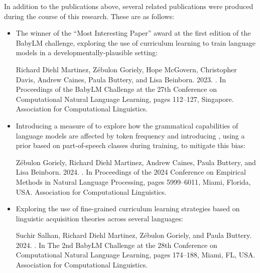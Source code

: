 In addition to the publications above, several related publications were produced during the course of this research. These are as follows:

\begin{itemize}
\item The winner of the \enquote{Most Interesting Paper} award at the first edition of the BabyLM challenge, exploring the use of curriculum learning to train language models in a developmentally-plausible setting:
\begin{mdframed}[linewidth=1pt]
    Richard Diehl Martinez, Z\'ebulon Goriely, Hope McGovern, Christopher Davis, Andrew Caines, Paula Buttery, and Lisa Beinborn. 2023. \href{https://aclanthology.org/2023.conll-babylm.10/}{}. In Proceedings of the BabyLM Challenge at the 27th Conference on Computational Natural Language Learning, pages 112--127, Singapore. Association for Computational Linguistics.
\end{mdframed}

\item Introducing a measure of  to explore how the grammatical capabilities of language models are affected by token frequency and introducing , using a prior based on part-of-speech classes during training, to mitigate this bias:
\begin{mdframed}[linewidth=1pt]
    Z\'ebulon Goriely, Richard Diehl Martinez, Andrew Caines, Paula Buttery, and Lisa Beinborn. 2024. \href{https://aclanthology.org/2024.emnlp-main.344/}{}. In Proceedings of the 2024 Conference on Empirical Methods in Natural Language Processing, pages 5999–6011, Miami, Florida, USA. Association for Computational Linguistics.
\end{mdframed}

\item Exploring the use of fine-grained curriculum learning strategies based on linguistic acquisition theories across several languages:
\begin{mdframed}[linewidth=1pt]
    Suchir Salhan, Richard Diehl Martinez, Z\'ebulon Goriely, and Paula Buttery. 2024. \href{https://aclanthology.org/2024.conll-babylm.15/}{}. In The 2nd BabyLM Challenge at the 28th Conference on Computational Natural Language Learning, pages 174--188, Miami, FL, USA. Association for Computational Linguistics.
\end{mdframed}


\end{itemize}
